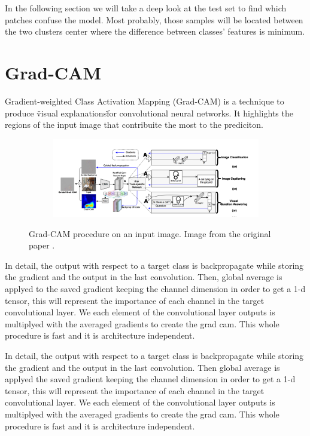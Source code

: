 \documentclass[../document.tex]{subfiles}
\begin{document}
In the following section we will take a deep look at the test set to find which patches confuse the model. Most probably, those samples will be located between the two clusters center where the difference between classes' features is minimum.
\section{Grad-CAM}
Gradient-weighted Class Activation Mapping (Grad-CAM) \cite{gradcam} is a technique to produce \"visual explanations\" for convolutional neural networks. It highlights the regions of the input image that contribuite the most to the prediciton. 
\begin{figure}[H]
    \centering
    \begin{subfigure}[b]{1\textwidth}
        \includegraphics[width=\linewidth]{../img/5/grad_cam1.png}
    \end{subfigure}
\caption{Grad-CAM procedure on an input image. Image from the original paper \cite{gradcam}.}
\end{figure}
In detail, the output with respect to a target class is backpropagate while storing the gradient and the output in the last convolution. Then, global average is applyed to the saved gradient keeping the channel dimension in order to get a 1-d tensor, this will represent the importance of each channel in the target convolutional layer. We  each element of the convolutional layer outputs is multiplyed with the averaged gradients to create the grad cam. This whole procedure is fast and it is architecture independent.

In detail, the output with respect to a target class is backpropagate while storing the gradient and the output in the last convolution. Then global average is applyed the saved gradient keeping the channel dimension in order to get a 1-d tensor, this will represent the importance of each channel in the target convolutional layer. We  each element of the convolutional layer outputs is multiplyed with the averaged gradients to create the grad cam. This whole procedure is fast and it is architecture independent.
% 
% 
%
\end{document}
